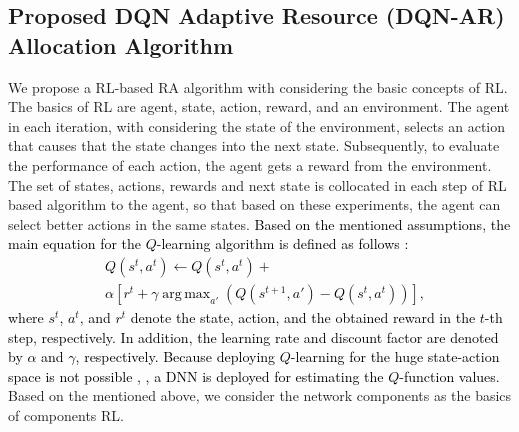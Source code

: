 \documentclass[20pt,twocolumn]{IEEEtran}
\DeclareMathOperator*{\argmax}{arg\,max} \setcounter{page}{1}
\begin{document}
\subsection{Proposed DQN Adaptive Resource (DQN-AR) Allocation Algorithm}  
We propose a RL-based RA algorithm  with considering the basic concepts of RL. The basics of RL are agent, state, action, reward, and an environment. The agent in each iteration, with considering the state of the environment, selects an action that causes that the state changes into the next state. Subsequently, to evaluate the performance of each action, the agent gets a reward from the environment. The set of states, actions, rewards and next state is collocated in each step of RL based algorithm to the agent, so that based on these experiments, the agent can select better actions in the same states. 
\textcolor{black}{Based on the mentioned assumptions, the main equation for the $Q$-learning algorithm is defined as follows \cite{sutton2018reinforcement}: 
	\begin{align}
	&Q(s^t,a^t)\leftarrow Q(s^t,a^t)+ \\ \nonumber
	&\alpha \left[  r^t+\gamma \argmax_{a'}\left(Q(s^{t+1},a')-Q(s^t,a^t) \right) \right] ,
	\end{align}
	where $s^t$, $a^t$, and $r^t$ denote the state, action, and the obtained reward in the $t$-th step, respectively. In addition, the learning rate and discount factor are denoted by $\alpha$ and $\gamma$, respectively. Because deploying $Q$-learning for the huge state-action space is not possible \cite{li2018deep}, \cite{qu2020dynamic}, a DNN is deployed for estimating the $Q$-function values.}
\\
Based on the  mentioned above, we consider the network components as the basics  of components RL.
\end{document}
